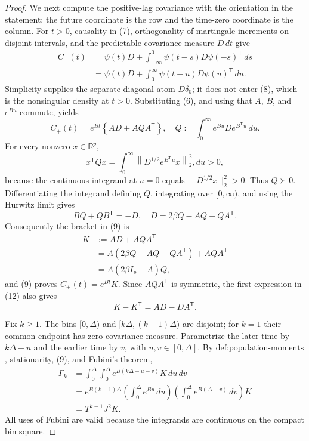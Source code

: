 \documentclass{article}
\begin{document}
\begin{proof}
We next compute the positive-lag covariance with the orientation in the statement: the future coordinate is the row and the time-zero coordinate is the column.  For \(t>0\), causality in (7), orthogonality of martingale increments on disjoint intervals, and the predictable covariance measure \(D\,dt\) give
\[
 \begin{aligned}
 C_{+}(t)
 &=\psi(t)D+
   \int_{-\infty}^{0}\psi(t-s)D\psi(-s)^{\mathsf T}\,ds\\
 &=\psi(t)D+\int_0^\infty\psi(t+u)D\psi(u)^{\mathsf T}\,du.
 \end{aligned}
\tag{8}
\]
Simplicity supplies the separate diagonal atom \(D\delta_0\); it does not enter (8), which is the nonsingular density at \(t>0\).  Substituting (6), and using that \(A\), \(B\), and \(e^{Bu}\) commute, yields
\[
 C_{+}(t)
 =e^{Bt}\left\{AD+AQA^{\mathsf T}\right\},\quad
 Q:=\int_0^\infty e^{Bu}De^{B^{\mathsf T}u}\,du.
\tag{9}
\]
For every nonzero \(x\in\mathbb R^p\),
\[
 x^{\mathsf T}Qx
 =\int_0^\infty
 \left\|D^{1/2}e^{B^{\mathsf T}u}x\right\|_2^2,du>0,
\tag{10}
\]
because the continuous integrand at \(u=0\) equals \(\|D^{1/2}x\|_2^2>0\).  Thus \(Q\succ0\).  Differentiating the integrand defining \(Q\), integrating over \([0,\infty)\), and using the Hurwitz limit gives
\[
 BQ+QB^{\mathsf T}=-D,\quad
 D=2\beta Q-AQ-QA^{\mathsf T}.
\tag{11}
\]
Consequently the bracket in (9) is
\[
 \begin{aligned}
 K&:=AD+AQA^{\mathsf T}\\
 &=A(2\beta Q-AQ-QA^{\mathsf T})+AQA^{\mathsf T}\\
 &=A(2\beta I_p-A)Q,
 \end{aligned}
\tag{12}
\]
and (9) proves \(C_{+}(t)=e^{Bt}K\).  Since \(AQA^{\mathsf T}\) is symmetric, the first expression in (12) also gives
\[
 K-K^{\mathsf T}=AD-DA^{\mathsf T}.
\tag{13}
\]

Fix \(k\geq1\).  The bins \([0,\Delta)\) and \([k\Delta,(k+1)\Delta)\) are disjoint; for \(k=1\) their common endpoint has zero covariance measure.  Parametrize the later time by \(k\Delta+u\) and the earlier time by \(v\), with \(u,v\in[0,\Delta]\).  By \(\text{def:population-moments}\), stationarity, (9), and Fubini's theorem,
\[
 \begin{aligned}
 \Gamma_k
 &=\int_0^\Delta\!\int_0^\Delta
 e^{B(k\Delta+u-v)}K\,du\,dv\\
 &=e^{B(k-1)\Delta}
 \left(\int_0^\Delta e^{Bu}\,du\right)
 \left(\int_0^\Delta e^{B(\Delta-v)}\,dv\right)K\\
 &=T^{k-1}J^2K.
 \end{aligned}
\tag{14}
\]
All uses of Fubini are valid because the integrands are continuous on the compact bin square.


\end{proof}
\end{document}
